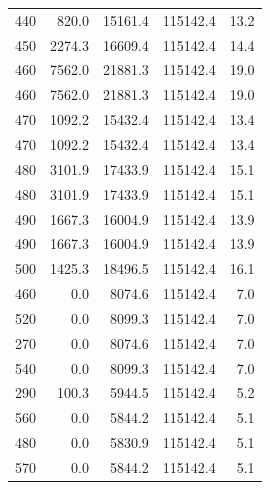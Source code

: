 \begin{longtable}{rrrrr}
    440 & \num{820.0} & \num{15161.4} & \num{115142.4} & 13.2 \\
    450 & \num{2274.3} & \num{16609.4} & \num{115142.4} & 14.4 \\
    460 & \num{7562.0} & \num{21881.3} & \num{115142.4} & 19.0 \\
    460 & \num{7562.0} & \num{21881.3} & \num{115142.4} & 19.0 \\
    470 & \num{1092.2} & \num{15432.4} & \num{115142.4} & 13.4 \\
    470 & \num{1092.2} & \num{15432.4} & \num{115142.4} & 13.4 \\
    480 & \num{3101.9} & \num{17433.9} & \num{115142.4} & 15.1 \\
    480 & \num{3101.9} & \num{17433.9} & \num{115142.4} & 15.1 \\
    490 & \num{1667.3} & \num{16004.9} & \num{115142.4} & 13.9 \\
    490 & \num{1667.3} & \num{16004.9} & \num{115142.4} & 13.9 \\
    500 & \num{1425.3} & \num{18496.5} & \num{115142.4} & 16.1 \\
    460 & \num{0.0} & \num{8074.6} & \num{115142.4} & 7.0 \\
    520 & \num{0.0} & \num{8099.3} & \num{115142.4} & 7.0 \\
    270 & \num{0.0} & \num{8074.6} & \num{115142.4} & 7.0 \\
    540 & \num{0.0} & \num{8099.3} & \num{115142.4} & 7.0 \\
    290 & \num{100.3} & \num{5944.5} & \num{115142.4} & 5.2 \\
    560 & \num{0.0} & \num{5844.2} & \num{115142.4} & 5.1 \\
    480 & \num{0.0} & \num{5830.9} & \num{115142.4} & 5.1 \\
    570 & \num{0.0} & \num{5844.2} & \num{115142.4} & 5.1 \\
\end{longtable}
\endgroup
